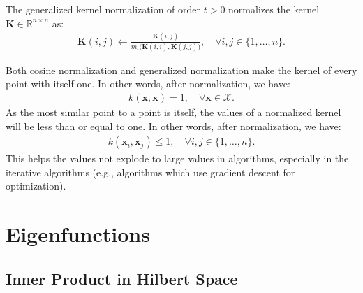 \documentclass[lang=cn,10pt]{gorgeousnbook}
\numberwithin{equation}{section}%
\numberwithin{figure}{section}%
\begin{document}
\begin{definition}
The generalized kernel normalization of order $t>0$ normalizes the kernel $\boldsymbol{K} \in \mathbb{R}^{n \times n}$ as:
\begin{align}
\boldsymbol{K}(i,j) \gets \frac{\boldsymbol{K}(i,j)}{m_t\big(\boldsymbol{K}(i,i), \boldsymbol{K}(j,j)\big)}, \quad \forall i,j \in \{1, \dots, n\}.
\end{align}
\end{definition}

Both cosine normalization and generalized normalization make the kernel of every point with itself one. In other words, after normalization, we have:
\begin{align}
k(\boldsymbol{x}, \boldsymbol{x}) = 1, \quad \forall \boldsymbol{x} \in \mathcal{X}.
\end{align}
As the most similar point to a point is itself, the values of a normalized kernel will be less than or equal to one. In other words, after normalization, we have:
\begin{align}
k(\boldsymbol{x}_i, \boldsymbol{x}_j) \leq 1, \quad \forall i,j \in \{1, \dots, n\}.
\end{align}
This helps the values not explode to large values in algorithms, especially in the iterative algorithms (e.g., algorithms which use gradient descent for optimization). 


\section{Eigenfunctions}\label{section_eigenfunctions}

\subsection{Inner Product in Hilbert Space}
\end{document}
